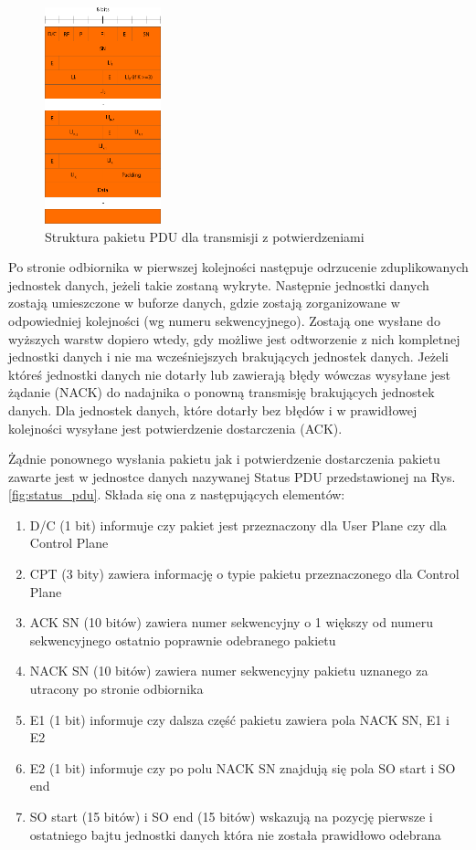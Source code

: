 \begin{figure}
	\centerline{\includegraphics[width=0.3\textwidth]{images/rlc_am_pdu.png}}
	\caption{Struktura pakietu PDU dla transmisji z potwierdzeniami}
	\label{fig:rlc_am_pdu}
\end{figure}

Po stronie odbiornika w pierwszej kolejności następuje odrzucenie zduplikowanych jednostek danych, jeżeli takie zostaną wykryte. Następnie jednostki danych zostają umieszczone w buforze danych, gdzie zostają zorganizowane w odpowiedniej kolejności (wg numeru sekwencyjnego). Zostają one wysłane do wyższych warstw dopiero wtedy, gdy możliwe jest odtworzenie z nich kompletnej jednostki danych i nie ma wcześniejszych brakujących jednostek danych. Jeżeli któreś jednostki danych nie dotarły lub zawierają błędy wówczas wysyłane jest żądanie (NACK) do nadajnika o ponowną transmisję brakujących jednostek danych. Dla jednostek danych, które dotarły bez błędów i w prawidłowej kolejności wysyłane jest potwierdzenie dostarczenia (ACK).

Żądnie ponownego wysłania pakietu jak i potwierdzenie dostarczenia pakietu zawarte jest w jednostce danych nazywanej Status PDU przedstawionej na Rys. \ref{fig:status_pdu}. Składa się ona z następujących elementów:

\begin{enumerate}
	\item D/C (1 bit) informuje czy pakiet jest przeznaczony dla User Plane czy dla Control Plane
	\item CPT (3 bity) zawiera informację o typie pakietu przeznaczonego dla Control Plane
	\item ACK SN (10 bitów) zawiera numer sekwencyjny o 1 większy od numeru sekwencyjnego ostatnio poprawnie odebranego pakietu
	\item NACK SN (10 bitów) zawiera numer sekwencyjny pakietu uznanego za utracony po stronie odbiornika
	\item E1 (1 bit) informuje czy dalsza część pakietu zawiera pola NACK SN, E1 i E2
	\item E2 (1 bit) informuje czy po polu NACK SN znajdują się pola SO start i SO end
	\item SO start (15 bitów) i SO end (15 bitów) wskazują na pozycję pierwsze i ostatniego bajtu jednostki danych która nie została prawidłowo odebrana
\end{enumerate}


